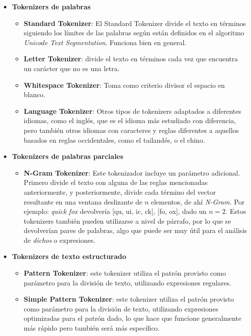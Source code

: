 \begin{itemize}
    
    \item \textbf{Tokenizers de palabras}
    \begin{itemize}
        \item \textbf{Standard Tokenizer}: El Standard Tokenizer divide el texto en términos siguiendo los límites de las palabras según están definidos en el algoritmo \textit{Unicode Text Segmentation}. Funciona bien en general.
        \item \textbf{Letter Tokenizer}: divide el texto en términos cada vez que encuentra un carácter que no es una letra.
        \item \textbf{Whitespace Tokenizer}: Toma como criterio divisor el espacio en blanco.
        \item \textbf{Language Tokenizer}: Otros tipos de tokenizers adaptados a diferentes idiomas, como el inglés, que es el idioma más estudiado con diferencia, pero también otros idiomas con caracteres y reglas diferentes a aquellos basados en reglas occidentales, como el tailandés, o el chino.
    \end{itemize}
    \item \textbf{Tokenizers de palabras parciales}
    \begin{itemize}
        \item \textbf{N-Gram Tokenizer}: Este tokenizador incluye un parámetro adicional. Primero divide el texto con alguna de las reglas mencionadas anteriormente, y posteriormente, divide cada término del vector resultante en una ventana deslizante de $n$ elementos, de ahí \textit{N-Gram.} Por ejemplo: \textit{quick fox} devolvería $[$qu, ui, ic, ck$]$, $[$fo, ox$]$, dado un $n = 2$. Estos tokenizers también pueden utilizarse a nivel de párrafo, por lo que se devolverían pares de palabras, algo que puede ser muy útil para el análisis de \textit{dichos} o expresiones.
    \end{itemize}
    \item \textbf{Tokenizers de texto estructurado}
    \begin{itemize}
        \item \textbf{Pattern Tokenizer}: este tokenizer utiliza el patrón provisto como parámetro para la división de texto, utilizando expresiones regulares.
        \item \textbf{Simple Pattern Tokenizer}: este tokenizer utiliza el patrón provisto como parámetro para la división de texto, utilizando expresiones optimizadas para el patrón dado, lo que hace que funcione generalmente más rápido pero también será más específico.
    \end{itemize}
\end{itemize}

